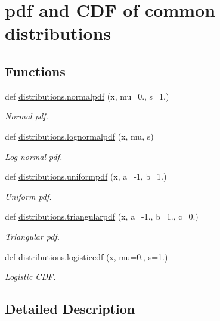 \hypertarget{group__pdfcdf}{}\section{pdf and C\+DF of common distributions}
\label{group__pdfcdf}
\subsection*{Functions}
\begin{DoxyCompactItemize}
\item 
def \hyperlink{group__pdfcdf_ga29778e1123c9e3c097c75b7b4baba234}{distributions.\+normalpdf} (x, mu=0., s=1.)
\begin{DoxyCompactList}\small\item\em Normal pdf. \end{DoxyCompactList}\item 
def \hyperlink{group__pdfcdf_ga497d2b033cdb7d6145aff8eebd21faf6}{distributions.\+lognormalpdf} (x, mu, s)
\begin{DoxyCompactList}\small\item\em Log normal pdf. \end{DoxyCompactList}\item 
def \hyperlink{group__pdfcdf_ga76fa8d628eea8916663ed087c8128263}{distributions.\+uniformpdf} (x, a=-\/1, b=1.)
\begin{DoxyCompactList}\small\item\em Uniform pdf. \end{DoxyCompactList}\item 
def \hyperlink{group__pdfcdf_ga2e4416223b57e1063c2d49720912fb62}{distributions.\+triangularpdf} (x, a=-\/1., b=1., c=0.)
\begin{DoxyCompactList}\small\item\em Triangular pdf. \end{DoxyCompactList}\item 
def \hyperlink{group__pdfcdf_ga3b4a7ea110fb1ade61f8a5455ff174c2}{distributions.\+logisticcdf} (x, mu=0., s=1.)
\begin{DoxyCompactList}\small\item\em Logistic C\+DF. \end{DoxyCompactList}\end{DoxyCompactItemize}


\subsection{Detailed Description}


